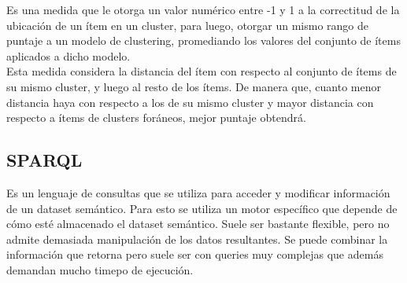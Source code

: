 Es una medida que le otorga un valor numérico entre -1 y 1 a la correctitud de la ubicación de un ítem en un cluster, para luego, otorgar un mismo 
rango de puntaje a un modelo de clustering, promediando los valores del conjunto de ítems aplicados a dicho modelo.\\
Esta medida considera la distancia del ítem con respecto al conjunto de ítems de su mismo cluster, y luego al resto de los ítems. De manera que,
cuanto menor distancia haya con respecto a los de su mismo cluster y mayor distancia con respecto a ítems de clusters foráneos, mejor puntaje obtendrá.

\subsection{SPARQL}

Es un lenguaje de consultas que se utiliza para acceder y modificar información de un dataset semántico. Para esto se utiliza un motor específico que depende 
de cómo esté almacenado el dataset semántico. Suele ser bastante flexible, pero no admite demasiada manipulación de los datos resultantes. 
Se puede combinar la información que retorna pero suele ser con queries muy complejas que además demandan mucho timepo de ejecución.